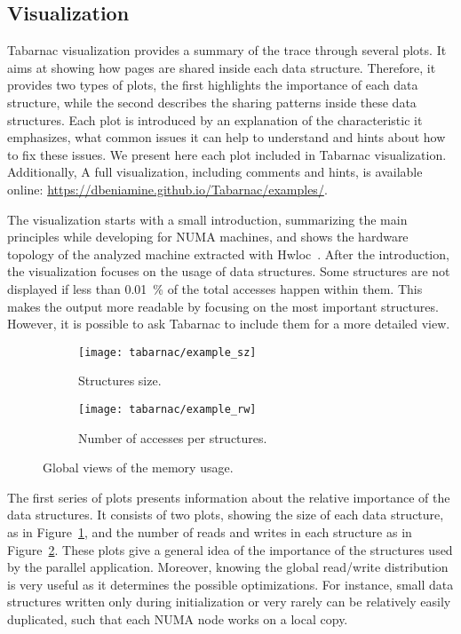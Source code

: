 \subsection{Visualization}

\gls{Tabarnac} visualization provides a summary of the trace through several plots.
It aims at showing how pages are shared inside each data structure.
Therefore, it provides two types of plots, the first highlights the importance of each data structure, while the second describes the sharing patterns inside these data structures.
Each plot is introduced by an explanation of the characteristic it emphasizes, what common issues it can help to understand and hints about how to fix these issues.
We present here each plot included in \gls{Tabarnac} visualization.
Additionally, A full visualization, including comments and hints, is available online: \url{https://dbeniamine.github.io/Tabarnac/examples/}.

The visualization starts with a small introduction, summarizing the main principles while developing for \gls{NUMA} machines, and shows the hardware topology of the analyzed machine extracted
with Hwloc~\cite{Broquedis10hwloc}.
After the introduction, the visualization focuses on the usage of data structures.
Some structures are not displayed if less than \SI{0.01}{\%} of the total accesses happen within them.
This makes the output more readable by focusing on the most important structures.
However, it is possible to ask \gls{Tabarnac} to include them for a more detailed view.

\begin{figure}[htb]
    \centering
    \begin{subfigure}{.49\linewidth}
        \texttt{[image: tabarnac/example\_sz]}
        \caption{Structures size.}
        \label{fig:example_sz}
    \end{subfigure}
    \begin{subfigure}{.49\linewidth}
        \texttt{[image: tabarnac/example\_rw]}
        \caption{Number of accesses per structures.}
        \label{fig:example_rw}
    \end{subfigure}
    \caption{Global views of the memory usage.}
    \label{fig:example_plot1}
\end{figure}

The first series of plots presents information about the relative importance of the data structures.
It consists of two plots, showing the size of each data structure, as in Figure~\ref{fig:example_sz}, and the number of reads and writes in each structure as in Figure~\ref{fig:example_rw}.
These plots give a general idea of the importance of the structures used by the parallel application.
Moreover, knowing the global read/write distribution is very useful as it determines the possible optimizations.
For instance, small data structures written only during initialization or very rarely can be relatively easily
duplicated, such that each \gls{NUMA} node works on a local copy.

